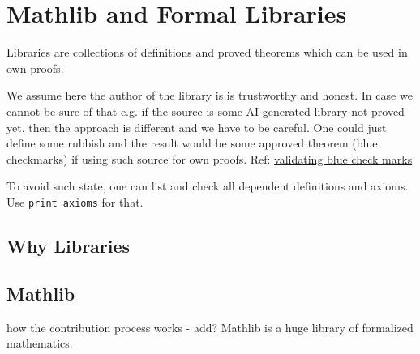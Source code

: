 \chapter{Mathlib and Formal Libraries}
\label{c:chapter5}

Libraries are collections of definitions and proved theorems which can be used in own proofs.

We assume here the author of the library is is trustworthy and honest. In case we cannot be sure of that e.g. if the source is some AI-generated library not proved yet, then the approach is different and we have to be careful. One could just define some rubbish and the result would be some approved theorem (blue checkmarks) if using such source for own proofs. Ref: \href{https://lean-lang.org/doc/reference/latest/find/?domain=Verso.Genre.Manual.section&name=validating-blue-check-marks}{validating blue check marks}

To avoid such state, one can list and check all dependent definitions and axioms. Use \texttt{print axioms} for that. 

\section{Why Libraries}


\section{Mathlib}
how the contribution process works - add?
Mathlib is a huge library of formalized mathematics.





